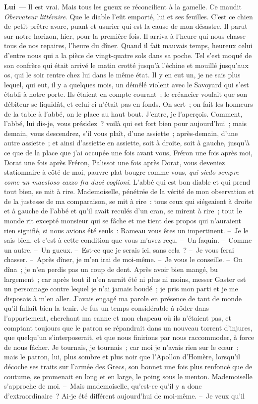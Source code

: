 \documentclass[french,twoside]{book} %
\newcommand{\labelchar}[1]{\textbf{\color{rubric} #1}}
\begin{document}
\labelchar{Lui} — Il est vrai. Mais tous les gueux se réconcilient à la gamelle. Ce maudit \emph{Obervateur littéraire}. Que le diable l’eût emporté, lui et ses feuilles. C’est ce chien de petit prêtre avare, puant et usurier qui est la cause de mon désastre. Il parut sur notre horizon, hier, pour la première fois. Il arriva à l’heure qui nous chasse tous de nos repaires, l’heure du dîner. Quand il fait mauvais temps, heureux celui d’entre nous qui a la pièce de vingt-quatre sols dans sa poche. Tel s’est moqué de son confrère qui était arrivé le matin crotté jusqu’à l’échine et mouillé jusqu’aux os, qui le soir rentre chez lui dans le même état. Il y en eut un, je ne sais plus lequel, qui eut, il y a quelques mois, un démêlé violent avec le Savoyard qui s’est établi à notre porte. Ils étaient en compte courant ; le créancier voulait que son débiteur se liquidât, et celui-ci n’était pas en fonds. On sert ; on fait les honneurs de la table à l’abbé, on le place au haut bout. J’entre, je l’aperçois. Comment, l’abbé, lui dis-je, vous présidez ? voilà qui est fort bien pour aujourd’hui ; mais demain, vous descendrez, s’il vous plaît, d’une assiette ; après-demain, d’une autre assiette ; et ainsi d’assiette en assiette, soit à droite, soit à gauche, jusqu’à ce que de la place que j’ai occupée une fois avant vous, Fréron une fois après moi, Dorat une fois après Fréron, Palissot une fois après Dorat, vous deveniez stationnaire à côté de moi, pauvre plat bougre comme vous, \emph{qui siedo sempre come un maestoso cazzo fra duoi coglioni}. L’abbé qui est bon diable et qui prend tout bien, se mit à rire. Mademoiselle, pénétrée de la vérité de mon observation et de la justesse de ma comparaison, se mit à rire : tous ceux qui siégeaient à droite et à gauche de l’abbé et qu’il avait reculés d’un cran, se mirent à rire ; tout le monde rit excepté monsieur qui se fâche et me tient des propos qui n’auraient rien signifié, si nous avions été seuls : Rameau vous êtes un impertinent. – Je le sais bien, et c’est à cette condition que vous m’avez reçu. – Un faquin. – Comme un autre. – Un gueux. – Est-ce que je serais ici, sans cela ? – Je vous ferai chasser. – Après dîner, je m’en irai de moi-même. – Je vous le conseille. – On dîna ; je n’en perdis pas un coup de dent. Après avoir bien mangé, bu largement ; car après tout il n’en aurait été ni plus ni moins, messer Gaster est un personnage contre lequel je n’ai jamais boudé ; je pris mon parti et je me disposais à m’en aller. J’avais engagé ma parole en présence de tant de monde qu’il fallait bien la tenir. Je fus un temps considérable à rôder dans l’appartement, cherchant ma canne et mon chapeau où ils n’étaient pas, et comptant toujours que le patron se répandrait dans un nouveau torrent d’injures, que quelqu’un s’interposerait, et que nous finirions par nous raccommoder, à force de nous fâcher. Je tournais, je tournais ; car moi je n’avais rien sur le cœur ; mais le patron, lui, plus sombre et plus noir que l’Apollon d’Homère, lorsqu’il décoche ses traits sur l’armée des Grecs, son bonnet une fois plus renfoncé que de coutume, se promenait en long et en large, le poing sous le menton. Mademoiselle s’approche de moi. – Mais mademoiselle, qu’est-ce qu’il y a donc d’extraordinaire ? Ai-je été différent aujourd’hui de moi-même. – Je veux qu’il 
\end{document}
